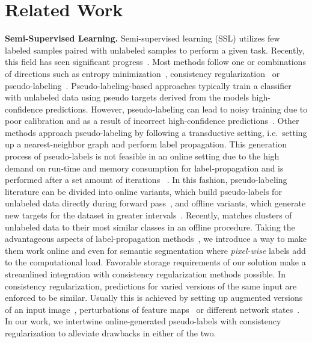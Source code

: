 \documentclass[letterpaper]{article} %
\begin{document}
\section{Related Work}
\noindent\textbf{Semi-Supervised Learning.} Semi-supervised learning (SSL) utilizes few labeled samples paired with unlabeled samples to perform a given task. 
Recently, this field has seen significant progress~\cite{berthelot2019mixmatch,berthelot2019remixmatch,cascante2020curriculum,ouali2020semi,chen2020big,sohn2020fixmatch,pham2021meta}. Most methods follow one or combinations of directions such as entropy minimization~\cite{grandvalet2005semi}, consistency regularization~\cite{tarvainen2017mean,ji2019invariant,sohn2020fixmatch} or pseudo-labeling~\cite{lee2013pseudo,iscen2019label,cascante2020curriculum}. Pseudo-labeling-based approaches typically train a classifier with unlabeled data using pseudo targets derived from the models high-confidence predictions\cite{lee2013pseudo}. However, pseudo-labeling can lead to noisy training due to poor calibration and as a result of incorrect high-confidence predictions~\cite{guo2017calibration,rizve2021defense}. Other methods approach pseudo-labeling by following a transductive setting, i.e.~setting up a nearest-neighbor graph and perform label propagation. This generation process of pseudo-labels is not feasible in an online setting due to the high demand on run-time and memory consumption for label-propagation and is performed after a set amount of iterations  ~\cite{shi2018transductive,iscen2019label,liu2019deep}. 
In this fashion, pseudo-labeling literature can be divided into online variants, which build pseudo-labels for unlabeled data directly during forward pass~\cite{lee2013pseudo,sohn2020fixmatch}, and offline variants, which generate new targets for the dataset in greater intervals~\cite{iscen2019label,chen2020big, xie2020self,cascante2020curriculum, pham2021meta}. Recently, \cite{taherkhani2021self} matches clusters of unlabeled data to their most similar classes in an offline procedure.
Taking the advantageous aspects of label-propagation methods~\cite{shi2018transductive,iscen2019label,liu2019deep}, we introduce a way to make them work online and even for semantic segmentation where \emph{pixel-wise} labels add to the computational load.
Favorable storage requirements of our solution make a streamlined integration with consistency regularization methods possible.
In consistency regularization, predictions for varied versions of the same input are enforced to be similar.
Usually this is achieved by setting up augmented versions of an input image~\cite{sohn2020fixmatch}, perturbations of feature maps~\cite{ouali2020semi} or different network states~\cite{tarvainen2017mean}.
In our work, we intertwine online-generated pseudo-labels with consistency regularization to alleviate drawbacks in either of the two.
\end{document}
